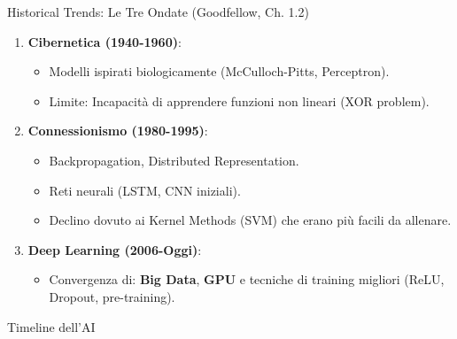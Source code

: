 \documentclass[aspectratio=169, 10pt]{beamer}
\begin{document}
\begin{frame}{Historical Trends: Le Tre Ondate (Goodfellow, Ch. 1.2)}
    \begin{enumerate}
        \item \textbf{Cibernetica (1940-1960)}:
        \begin{itemize}
            \item Modelli ispirati biologicamente (McCulloch-Pitts, Perceptron).
            \item Limite: Incapacità di apprendere funzioni non lineari (XOR problem).
        \end{itemize}
        \item \textbf{Connessionismo (1980-1995)}:
        \begin{itemize}
            \item Backpropagation, Distributed Representation.
            \item Reti neurali (LSTM, CNN iniziali).
            \item Declino dovuto ai Kernel Methods (SVM) che erano più facili da allenare.
        \end{itemize}
        \item \textbf{Deep Learning (2006-Oggi)}:
        \begin{itemize}
            \item Convergenza di: \textbf{Big Data}, \textbf{GPU} e tecniche di training migliori (ReLU, Dropout, pre-training).
        \end{itemize}
    \end{enumerate}
\end{frame}

\begin{frame}{Timeline dell'AI}
    \centering
\end{frame}
\end{document}
